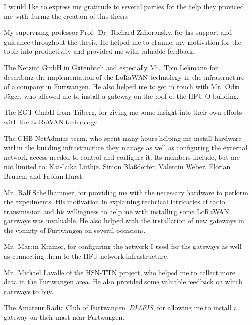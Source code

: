 I would like to express my gratitude to several parties for the help they provided me with during the creation of this thesis:

My supervising professor Prof.\ Dr.\ Richard Zahoransky, for his support and guidance throughout the thesis.
He helped me to channel my motivation for the topic into productivity and provided me with valuable feedback.

The Netzint GmbH in Gütenbach and especially Mr.\ Tom Lehmann for describing the implementation of the \ac{LoRaWAN} technology in the infrastructure of a company in Furtwangen.
He also helped me to get in touch with Mr.\ Odin Jäger, who allowed me to install a gateway on the roof of the \ac{HFU} O building.

The EGT GmbH from Triberg, for giving me some insight into their own efforts with the \ac{LoRaWAN} technology.

The \ac{GHB} NetAdmins team, who spent many hours helping me install hardware within the building infrastructure they manage as well as configuring the external network access needed to control and configure it.
Its members include, but are not limited to: Kai-Luka Lüthje, Simon Blaßdörfer, Valentin Weber, Florian Brunen, and Fabian Hurst.

Mr.\ Ralf Schellhammer, for providing me with the necessary hardware to perform the experiments.
His motivation in explaining technical intricacies of radio transmission and his willingness to help me with installing some \ac{LoRaWAN} gateways was invaluable.
He also helped with the installation of new gateways in the vicinity of Furtwangen on several occasions.

Mr.\ Martin Kramer, for configuring the network I used for the gateways as well as connecting them to the \ac{HFU} network infrastructure.

Mr.\ Michael Lavalle of the \ac{HSN-TTN} project, who helped me to collect more data in the Furtwangen area.
He also provided some valuable feedback on which gateways to buy.

The Amateur Radio Club of Furtwangen, \emph{DL0FIS}, for allowing me to install a gateway on their mast near Furtwangen.
